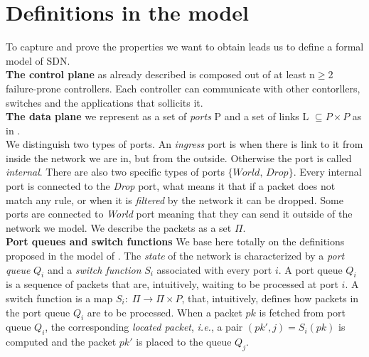 \documentclass{article}
\theoremstyle{remark}
\begin{document}
\section{Definitions in the model}
To capture and prove the properties we want to obtain leads us to define a formal model of SDN. \\
% 
\textbf{The control plane} as already described is composed out of at least n$\geq$2 failure-prone controllers. Each controller can communicate with other contorllers, switches and the applications that sollicits it. \\
\textbf{The data plane} we represent as a set of \emph{ports} P and a set of links L $\subseteq P\times P$ as in \cite{Reitblatt:2012:ANU:2342356.2342427}. \\
We distinguish two types of ports. An \emph{ingress} port is when there is link to it from inside the network we are in, but from the outside. Otherwise the port is called \emph{internal}. There are also two specific types of ports $\lbrace \textit{World, Drop}\rbrace$. Every internal port is connected to the \emph{Drop} port, what means it that if a packet does not match any rule, or when it is \emph{filtered} by the network it can be dropped. Some ports are connected to \emph{World} port meaning that they can send it outside of the network we model. We describe the packets as a set $\Pi$.\\
\textbf{Port queues and switch functions} We base here totally on the definitions proposed in the model of \cite{CKLS15}.
The \emph{state} of the network is characterized by a \emph{port
  queue} $Q_i$ and a \emph{switch function} $S_i$ associated with
every port $i$.
A port queue $Q_i$ is a sequence of packets that are, intuitively, waiting to be processed at port $i$.
A switch function is a map $S_i:\;\Pi\rightarrow \Pi\times P$,
that, intuitively, defines how packets in
the port queue $Q_i$ are to be processed.
When a packet $\textit{pk}$ is fetched from port queue $Q_i$, the corresponding \emph{located
  packet}, \emph{i.e.}, a pair $(\textit{pk}',j)=S_i(\textit{pk})$ is computed and the packet $\textit{pk}'$ is placed to the queue $Q_j$.
\end{document}
